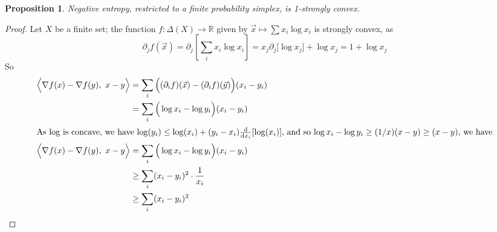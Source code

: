 \documentclass{article}
\theoremstyle{plain}
\newtheorem{prop}[theorem]{Proposition}
\theoremstyle{definition}
\theoremstyle{remark}
\numberwithin{equation}{section}
\begin{document}
{%
\begin{prop}\label{prop:neg-ent-convex}
  Negative entropy, restricted to a finite probability
			simplex, is 1-strongly convex. 
\end{prop}
\begin{proof}
	Let $X$ be a finite set; the function $f: \Delta(X) \to \mathbb R$ given by $\vec x \mapsto \sum x_i \log x_i$ is strongly convex, as 
	\begin{equation*}
		\partial_j f(\vec x) =  \partial_j\left[\sum_i x_i \log x_i \right] = 
			x_j \partial_j \big[\log x_j \big] + \log x_j = 1 + \log x_j
	\end{equation*}
	So
	\begin{align*}
		\Big\langle \nabla f(x) - \nabla f(y),~ x-y\Big\rangle 
			&= \sum_i \Big((\partial_i f)(\vec x) - (\partial_i f)(\vec y)\Big)(x_i - y_i) \\
			&= \sum_i \Big(\log x_i  - \log y_i \Big)(x_i - y_i) \\
		\intertext{As $\log$ is concave, we have $\log(y_i) \leq \log(x_i) + (y_i-x_i) \frac{\mathrm d}{\mathrm d x_i} [\log(x_i)]$, and so $\log x_i - \log y_i \geq (1/x) (x - y)  \geq (x-y)$, we have}
		\Big\langle \nabla f(x) - \nabla f(y),~ x-y\Big\rangle
			&= \sum_i \Big(\log x_i  - \log y_i \Big)(x_i - y_i) \\ %
			&\geq \sum_i (x_i-y_i)^2 \cdot \frac1{x_i}\\
			&\geq \sum_i (x_i-y_i)^2 \\

\end{align*}
\end{proof}}
\end{document}
